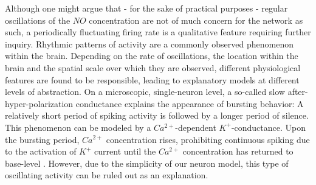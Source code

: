 \documentclass[10pt,a4paper]{article}
\begin{document}
Although one might argue that - for the sake of practical purposes - regular oscillations of the $NO$ concentration are not of much concern for the network as such, a periodically fluctuating firing rate is a qualitative feature requiring further inquiry. Rhythmic patterns of activity are a commonly observed phenomenon within the brain. Depending on the rate of oscillations, the location within the brain and the spatial scale over which they are observed, different physiological features are found to be responsible, leading to explanatory models at different levels of abstraction. On a microscopic, single-neuron level, a so-called slow after-hyper-polarization conductance explains the appearance of bursting behavior: A relatively short period of spiking activity is followed by a longer period of silence. This phenomenon can be modeled by a $Ca^{2+}$-dependent $K^{+}$-conductance. Upon the bursting period, $Ca^{2+}$ concentration rises, prohibiting continuous spiking due to the activation of $K^{+}$  current until the $Ca^{2+}$ concentration has returned to base-level \cite[p.~203-207]{Theor_Neur_Dayan}. However, due to the simplicity of our neuron model, this type of oscillating activity can be ruled out as an explanation.
\end{document}
